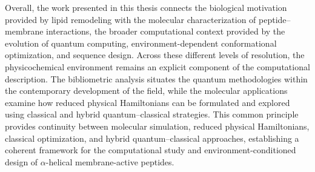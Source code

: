 Overall, the work presented in this thesis connects the biological motivation provided by lipid remodeling with the molecular characterization of peptide--membrane interactions, the broader computational context provided by the evolution of quantum computing, environment-dependent conformational optimization, and sequence design. Across these different levels of resolution, the physicochemical environment remains an explicit component of the computational description. The bibliometric analysis situates the quantum methodologies within the contemporary development of the field, while the molecular applications examine how reduced physical Hamiltonians can be formulated and explored using classical and hybrid quantum--classical strategies. This common principle provides continuity between molecular simulation, reduced physical Hamiltonians, classical optimization, and hybrid quantum--classical approaches, establishing a coherent framework for the computational study and environment-conditioned design of $\alpha$-helical membrane-active peptides.